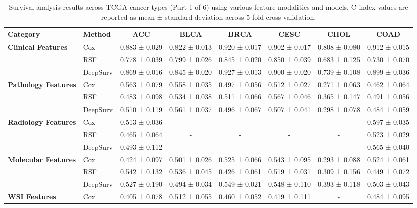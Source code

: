 \begin{sidewaystable}[htbp]
    \centering
    \caption{Survival analysis results across TCGA cancer types (Part 1 of 6) using various feature modalities and models. C-index values are reported as mean ± standard deviation across 5-fold cross-validation.}
    \label{tab:survival_results_1}
    \begin{tabular}{@{}llcccccc@{}}
        \toprule
        \textbf{Category} & \textbf{Method} & \textbf{ACC} & \textbf{BLCA} & \textbf{BRCA} & \textbf{CESC} & \textbf{CHOL} & \textbf{COAD} \\
        \midrule
        \multirow{3}{*}{\textbf{Clinical Features}} & Cox & 0.883 ± 0.029 & 0.822 ± 0.013 & 0.920 ± 0.017 & 0.902 ± 0.017 & 0.808 ± 0.080 & 0.912 ± 0.015 \\
        & RSF & 0.778 ± 0.039 & 0.799 ± 0.026 & 0.845 ± 0.020 & 0.850 ± 0.039 & 0.683 ± 0.125 & 0.730 ± 0.070 \\
        & DeepSurv & 0.869 ± 0.016 & 0.845 ± 0.020 & 0.927 ± 0.013 & 0.900 ± 0.020 & 0.739 ± 0.108 & 0.899 ± 0.036 \\
        \midrule
        \multirow{3}{*}{\textbf{Pathology Features}} & Cox & 0.563 ± 0.079 & 0.558 ± 0.035 & 0.497 ± 0.056 & 0.512 ± 0.027 & 0.271 ± 0.063 & 0.462 ± 0.064 \\
        & RSF & 0.483 ± 0.098 & 0.534 ± 0.038 & 0.511 ± 0.066 & 0.567 ± 0.046 & 0.365 ± 0.147 & 0.491 ± 0.056 \\
        & DeepSurv & 0.510 ± 0.119 & 0.561 ± 0.037 & 0.496 ± 0.067 & 0.507 ± 0.041 & 0.298 ± 0.078 & 0.484 ± 0.059 \\
        \midrule
        \multirow{3}{*}{\textbf{Radiology Features}} & Cox & 0.513 ± 0.036 & - & - & - & - & 0.597 ± 0.035 \\
        & RSF & 0.465 ± 0.064 & - & - & - & - & 0.523 ± 0.029 \\
        & DeepSurv & 0.493 ± 0.112 & - & - & - & - & 0.565 ± 0.040 \\
        \midrule
        \multirow{3}{*}{\textbf{Molecular Features}} & Cox & 0.424 ± 0.097 & 0.501 ± 0.026 & 0.525 ± 0.066 & 0.543 ± 0.095 & 0.293 ± 0.088 & 0.524 ± 0.061 \\
        & RSF & 0.542 ± 0.132 & 0.536 ± 0.045 & 0.426 ± 0.061 & 0.519 ± 0.031 & 0.309 ± 0.156 & 0.449 ± 0.072 \\
        & DeepSurv & 0.527 ± 0.190 & 0.494 ± 0.034 & 0.549 ± 0.021 & 0.548 ± 0.110 & 0.393 ± 0.118 & 0.503 ± 0.043 \\
        \midrule
        \multirow{3}{*}{\textbf{WSI Features}} & Cox & 0.405 ± 0.078 & 0.512 ± 0.055 & 0.460 ± 0.052 & 0.419 ± 0.111 & - & 0.484 ± 0.095 \\

\end{tabular}
\end{sidewaystable}
